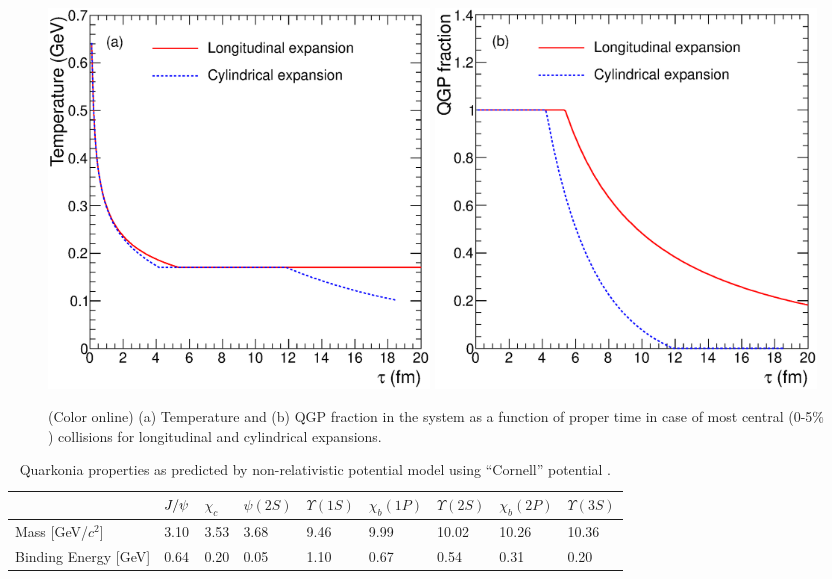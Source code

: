 \documentclass[aps,prc,preprint,superscriptaddress,showpacs,showkeys]{revtex4-1}
\begin{document}
\begin{figure}
\includegraphics[width=0.49\textwidth]{Fig1a_TauVsTemp.eps}
\includegraphics[width=0.49\textwidth]{Fig1b_TauVsFQGP.eps}
\caption{(Color online) (a) Temperature and (b) QGP fraction in the system as a function of proper 
time in case of most central (0-5$\%$) collisions for longitudinal and cylindrical expansions.}
\label{fig:TauVsTemp}
\end{figure}





\begin{table}
\caption[]{Quarkonia properties as predicted by non-relativistic potential model using 
``Cornell'' potential \cite{colorSatz}.}
\label{Tab:QuarkoniaProperties}
\begin{tabular}{l|l|l|l|l|l|l|l|l} 
\hline   
\hline
    &$J/\psi$  &$\chi_c$  &$\psi(2S)$ &$\Upsilon(1S)$ &$\chi_b(1P)$ &$\Upsilon(2S)$ &$\chi_b(2P)$ &$\Upsilon(3S)$ \\ 
\hline 
Mass [GeV/$c^2$]                      &3.10     &3.53  &3.68  &9.46  &9.99  &10.02  &10.26   &10.36 \\
Binding Energy [GeV]                  &0.64     &0.20  &0.05  &1.10  &0.67  &0.54   &0.31    &0.20 \\
\hline
\hline
\end{tabular}
\end{table}
\end{document}
